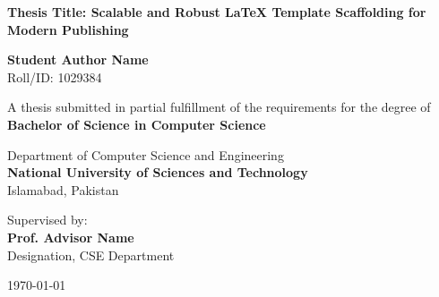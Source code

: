 \begin{titlepage}
\begin{center}
    \vspace*{1cm}
    
    
    \vspace{1.5cm}
    
    {\huge \bfseries \color{primary} Thesis Title: Scalable and Robust LaTeX Template Scaffolding for Modern Publishing}
    
    \vspace{1.5cm}
    
    {\Large \bfseries Student Author Name} \\
    \vspace{0.2cm}
    {Roll/ID: 1029384}
    
    \vspace{1.5cm}
    
    {A thesis submitted in partial fulfillment of the requirements for the degree of} \\
    \vspace{0.3cm}
    {\large \bfseries \color{secondary} Bachelor of Science in Computer Science}
    
    \vspace{1.5cm}
    
    {\large Department of Computer Science and Engineering} \\
    \vspace{0.2cm}
    {\large \bfseries \color{primary} National University of Sciences and Technology} \\
    \vspace{0.1cm}
    {Islamabad, Pakistan}
    
    \vfill
    
    {Supervised by:} \\
    {\large \bfseries Prof. Advisor Name} \\
    {Designation, CSE Department}
    
    \vspace{1cm}
    
    {\large \today}
    
\end{center}
\end{titlepage}
